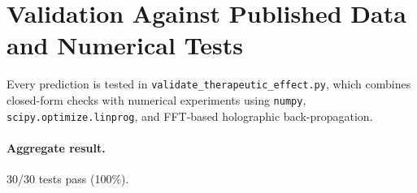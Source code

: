 \documentclass[twocolumn,10pt,a4paper]{article}
\theoremstyle{definition}
\theoremstyle{remark}
\begin{document}
\section{Validation Against Published Data and Numerical Tests}

Every prediction is tested in \texttt{validate\_therapeutic\_effect.py}, which combines closed-form checks with numerical experiments using \texttt{numpy}, \texttt{scipy.optimize.linprog}, and FFT-based holographic back-propagation.

\paragraph{Aggregate result.} 30/30 tests pass (100\%).
\end{document}

